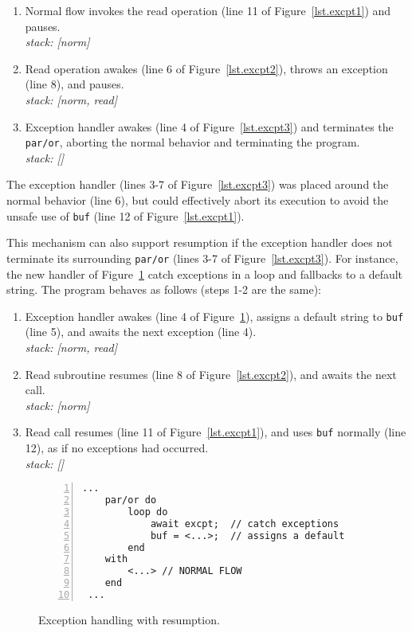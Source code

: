 \documentclass{acm_proc_article-sp}
\newcommand{\code}[1] {{\small{\texttt{#1}}}}
\newcommand{\1}{\;}
\newcommand{\2}{\;\;}
\newcommand{\3}{\;\;\;}
\newcommand{\5}{\;\;\;\;\;}
\begin{document}
{\small
\begin{enumerate}
\setlength{\itemsep}{0pt}
\item Normal flow invokes the read operation (line 11 of 
    Figure~\ref{lst.excpt1}) and pauses.\\
    \emph{stack: [norm]}
\item Read operation awakes (line 6 of Figure~\ref{lst.excpt2}), throws an 
    exception (line 8), and pauses.\\
    \emph{stack: [norm, read]}
\item Exception handler awakes (line 4 of Figure~\ref{lst.excpt3}) and 
terminates the \code{par/or}, aborting the normal behavior and terminating the 
program. \\
    \emph{stack: []}
\end{enumerate}
}

The exception handler (lines 3-7 of Figure~\ref{lst.excpt3}) was placed around 
the normal behavior (line 6), but could effectively abort its execution to 
avoid the unsafe use of \code{buf} (line 12 of Figure~\ref{lst.excpt1}).

This mechanism can also support resumption if the exception handler does not 
terminate its surrounding \code{par/or} (lines 3-7 of Figure~\ref{lst.excpt3}).
For instance, the new handler of Figure~\ref{lst.excpt4} catch exceptions in a 
loop and fallbacks to a default string.
The program behaves as follows (steps 1-2 are the same):

{\small
\begin{enumerate}[start=3]
\setlength{\itemsep}{0pt}
\item Exception handler awakes (line 4 of Figure~\ref{lst.excpt4}), assigns a 
default string to \code{buf} (line 5), and awaits the next exception (line 4).  \\
    \emph{stack: [norm, read]}
\item Read subroutine resumes (line 8 of Figure~\ref{lst.excpt2}), and awaits 
the next call. \\
    \emph{stack: [norm]}
\item Read call resumes (line 11 of Figure~\ref{lst.excpt1}), and uses 
\code{buf} normally (line 12), as if no exceptions had occurred. \\
    \emph{stack: []}
\end{enumerate}
}

\begin{figure}[t]
\begin{lstlisting}[numbers=left,xleftmargin=2em]
 ...
    par/or do
        loop do
            await excpt;  // catch exceptions
            buf = <...>;  // assigns a default
        end
    with
        <...> // NORMAL FLOW
    end
 ...
\end{lstlisting}
\caption{ Exception handling with resumption.
\label{lst.excpt4}
}
\end{figure}
\end{document}
